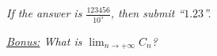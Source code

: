 \documentclass[a4paper, top=10mm]{article}
\begin{document}
	\vspace{\baselineskip}
	
	\textit{If the answer is $\frac{123456}{10^5}$, then submit “$1.23$”.}
	
	\vspace{5\baselineskip}
	
	\textit{\underline{Bonus:} What is $\lim_{n \to +\infty} C_n$?}
	
	
\end{document}
